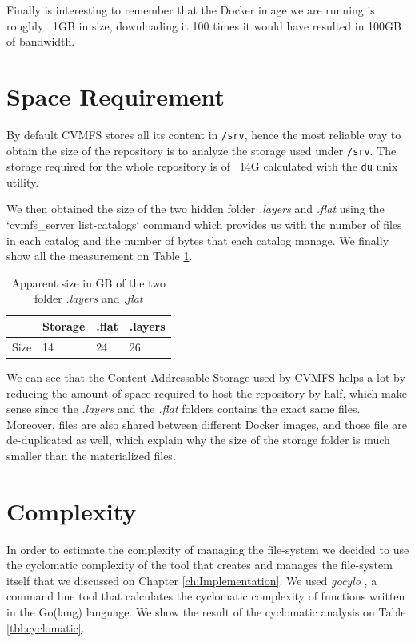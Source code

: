 Finally is interesting to remember that the Docker image we are running is
roughly ~1GB in size, downloading it 100 times it would have resulted in 100GB
of bandwidth.

\section{Space Requirement}

By default CVMFS stores all its content in \texttt{/srv}, hence the most
reliable way to obtain the size of the repository is to analyze the storage
used under \texttt{/srv}. The storage required for the whole repository is of
~14G calculated with the \texttt{du} unix utility.

We then obtained the size of the two hidden folder \textit{.layers} and
\textit{.flat} using the `cvmfs\_server list-catalogs` command which provides us
with the number of files in each catalog and the number of bytes that each
catalog manage. We finally show all the measurement on Table \ref{tab:size-of-repo}.

\begin{table}[h]
\begin{center}
\begin{tabular}{|l|lll|}
\hline
        & Storage & .flat & .layers \\ \hline
        Size & 14 & 24    & 26      \\ \hline
\end{tabular}
\end{center}
\caption{Apparent size in GB of the two folder \textit{.layers} and \textit{.flat}}
\label{tab:size-of-repo}
\end{table}

We can see that the Content-Addressable-Storage used by CVMFS helps a lot by
reducing the amount of space required to host the repository by half, which
make sense since the \textit{.layers} and the \textit{.flat} folders contains
the exact same files. Moreover, files are also shared between different Docker
images, and those file are de-duplicated as well, which explain why the size of
the storage folder is much smaller than the materialized files.

\section{Complexity}

In order to estimate the complexity of managing the file-system we decided to
use the cyclomatic complexity of the tool that creates and manages the
file-system itself that we discussed on Chapter \ref{ch:Implementation}. We used
\textit{gocylo} \cite{gocyclo}, a command line tool that calculates the
cyclomatic complexity of functions written in the Go(lang) language. We show
the result of the cyclomatic analysis on Table \ref{tbl:cyclomatic}.

